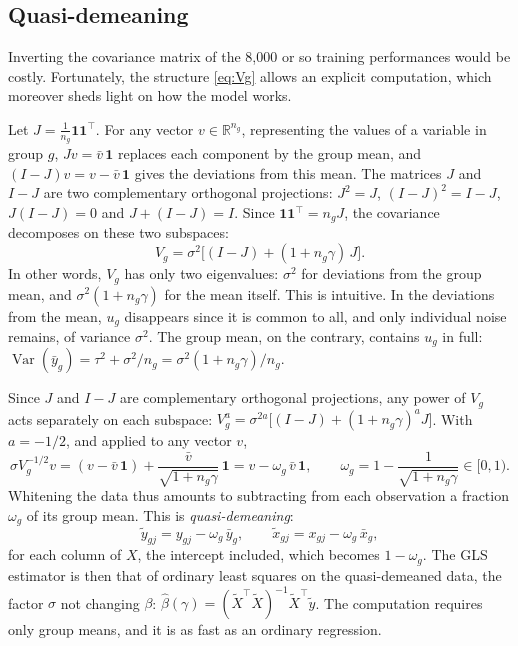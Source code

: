 \documentclass[11pt,a4paper]{article}
\DeclareMathOperator{\Var}{Var}
\begin{document}
\subsection{Quasi-demeaning}\label{sec:quasi_demeaning}

Inverting the covariance matrix of the 8,000 or so training performances would be costly. Fortunately, the structure
\eqref{eq:Vg} allows an explicit computation, which moreover sheds light on how the model works.

Let $J = \frac{1}{n_g}\mathbf 1\mathbf 1^\top$. For any vector $v \in \mathbb{R}^{n_g}$, representing the values of a
variable in group $g$, $Jv = \bar v\,\mathbf 1$ replaces each component by the group mean, and
$(I - J)v = v - \bar v\,\mathbf 1$ gives the deviations from this mean. The matrices $J$ and $I - J$ are two
complementary orthogonal projections: $J^2 = J$, $(I-J)^2 = I - J$, $J(I-J) = 0$ and $J + (I - J) = I$. Since
$\mathbf 1\mathbf 1^\top = n_g J$, the covariance decomposes on these two subspaces:
\[
V_g = \sigma^2\big[(I - J) + (1 + n_g\gamma)\,J\big].
\]
In other words, $V_g$ has only two eigenvalues: $\sigma^2$ for deviations from the group mean, and
$\sigma^2(1 + n_g\gamma)$ for the mean itself. This is intuitive. In the deviations from the mean, $u_g$ disappears
since it is common to all, and only individual noise remains, of variance $\sigma^2$. The group mean, on the contrary,
contains $u_g$ in full: $\Var(\bar y_g) = \tau^2 + \sigma^2/n_g = \sigma^2(1 + n_g\gamma)/n_g$.

Since $J$ and $I - J$ are complementary orthogonal projections, any power of $V_g$ acts separately on each subspace:
$V_g^{a} = \sigma^{2a}\big[(I - J) + (1 + n_g\gamma)^a J\big]$. With $a = -1/2$, and applied to any vector $v$,
\[
\sigma V_g^{-1/2} v = (v - \bar v\,\mathbf 1) + \frac{\bar v}{\sqrt{1 + n_g\gamma}}\,\mathbf 1
= v - \omega_g\,\bar v\,\mathbf 1, \qquad \omega_g = 1 - \frac{1}{\sqrt{1 + n_g\gamma}} \in [0, 1) .
\]
Whitening the data thus amounts to subtracting from each observation a fraction $\omega_g$ of its group mean. This is
\emph{quasi-demeaning}:
\begin{equation}\label{eq:quasi_demeaning}
\tilde y_{gj} = y_{gj} - \omega_g\,\bar y_g, \qquad \tilde x_{gj} = x_{gj} - \omega_g\,\bar x_g,
\end{equation}
for each column of $X$, the intercept included, which becomes $1 - \omega_g$. The GLS estimator is then that of
ordinary least squares on the quasi-demeaned data, the factor $\sigma$ not changing $\beta$:
$\hat\beta(\gamma) = (\tilde X^\top \tilde X)^{-1}\tilde X^\top\tilde y$. The computation requires only group means,
and it is as fast as an ordinary regression.
\end{document}
